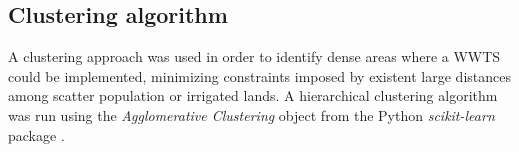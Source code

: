 





\subsection{Clustering algorithm}\label{Sc:clustering}
A clustering approach was used in order to identify dense areas where a WWTS could be implemented, minimizing constraints imposed by existent large distances among scatter population or irrigated lands. A hierarchical clustering  algorithm was run using the \textit{Agglomerative Clustering} object from the Python \textit{scikit-learn} package \cite{scikit-learn}.

